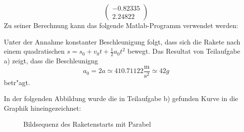 \begin{loesung}
\begin{teilaufgaben}
\[\begin{pmatrix}
    -0.82335\\
     2.24822
\end{pmatrix}
\]
Zu seiner Berechnung kann das folgende Matlab-Programm verwendet werden:
\item
Unter der Annahme konstanter Beschleunigung folgt,  dass sich die
Rakete nach einem quadratischen $s=s_0+v_0t+\frac12a_0t^2$ bewegt.
Das Resultat von Teilaufgabe a) zeigt, dass die Beschleunigng
\[
a_0=2a\simeq410.71122\frac{\text{m}}{\text{s}^2}\simeq42g
\]
betr"agt.
\end{teilaufgaben}
In der folgenden Abbildung wurde die in Teilaufgabe b) gefunden Kurve
in die Graphik hineingezeichnet:
\begin{figure}
\begin{center}
\end{center}
\caption{Bildsequenz des Raketenstarts mit Parabel\label{bildmitkurve}}
\end{figure}
\end{loesung}

